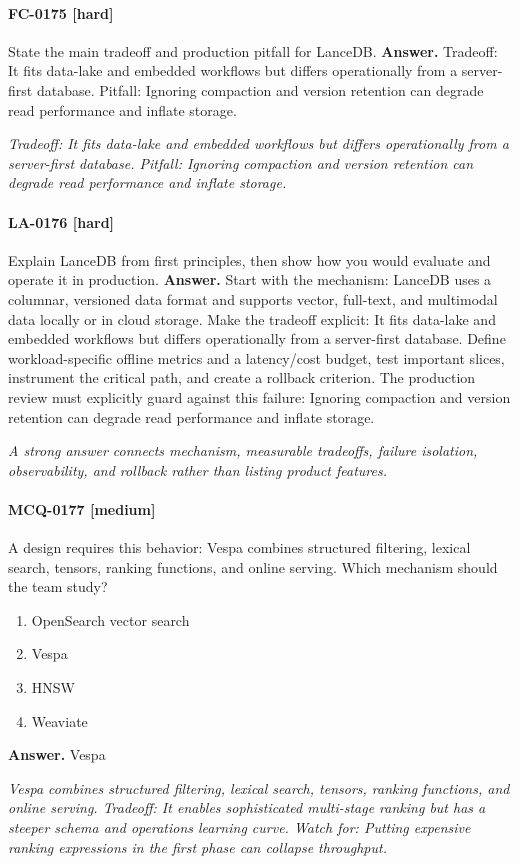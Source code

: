 \paragraph{FC-0175 [hard]} State the main tradeoff and production pitfall for LanceDB.
\noindent\textbf{Answer.} Tradeoff: It fits data-lake and embedded workflows but differs operationally from a server-first database. Pitfall: Ignoring compaction and version retention can degrade read performance and inflate storage.
\par\textit{Tradeoff: It fits data-lake and embedded workflows but differs operationally from a server-first database. Pitfall: Ignoring compaction and version retention can degrade read performance and inflate storage.}
\paragraph{LA-0176 [hard]} Explain LanceDB from first principles, then show how you would evaluate and operate it in production.
\noindent\textbf{Answer.} Start with the mechanism: LanceDB uses a columnar, versioned data format and supports vector, full-text, and multimodal data locally or in cloud storage. Make the tradeoff explicit: It fits data-lake and embedded workflows but differs operationally from a server-first database. Define workload-specific offline metrics and a latency/cost budget, test important slices, instrument the critical path, and create a rollback criterion. The production review must explicitly guard against this failure: Ignoring compaction and version retention can degrade read performance and inflate storage.
\par\textit{A strong answer connects mechanism, measurable tradeoffs, failure isolation, observability, and rollback rather than listing product features.}
\paragraph{MCQ-0177 [medium]} A design requires this behavior: Vespa combines structured filtering, lexical search, tensors, ranking functions, and online serving. Which mechanism should the team study?
\begin{enumerate}[label=\Alph*.]
\item OpenSearch vector search
\item Vespa
\item HNSW
\item Weaviate
\end{enumerate}
\noindent\textbf{Answer.} Vespa
\par\textit{Vespa combines structured filtering, lexical search, tensors, ranking functions, and online serving. Tradeoff: It enables sophisticated multi-stage ranking but has a steeper schema and operations learning curve. Watch for: Putting expensive ranking expressions in the first phase can collapse throughput.}
